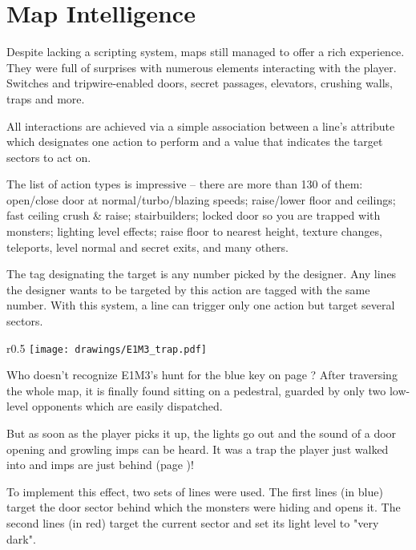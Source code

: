 \section{Map Intelligence}
Despite lacking a scripting system, maps still managed to offer a rich experience. They were full of surprises with numerous elements interacting with the player. Switches and tripwire-enabled doors, secret passages, elevators, crushing walls, traps and more.\\
\par
{}
\par
All interactions are achieved via a simple association between a line's  attribute which designates one action to perform and a  value that indicates the target sectors to act on.\\
\par
The list of action types is impressive -- there are more than 130 of them: open/close door at normal/turbo/blazing speeds; raise/lower floor and ceilings; fast ceiling crush \& raise; stairbuilders; locked door so you are trapped with monsters; lighting level effects; raise floor to nearest height, texture changes, teleports, level normal and secret exits, and many others.\\
\par
The tag designating the target is any number picked by the designer. Any lines the designer wants to be targeted by this action are tagged with the same number. With this system, a line can trigger only one action but target several sectors.\\
\par
{}
\pagebreak






\begin{wrapfigure}[17]{r}{0.5\textwidth}
\centering
\texttt{[image: drawings/E1M3\_trap.pdf]}
\end{wrapfigure}
Who doesn't recognize E1M3's hunt for the blue key on page \pageref{e1m3_trap}? After traversing the whole map, it is finally found sitting on a pedestral, guarded by only two low-level opponents which are easily dispatched.\\
\par
But as soon as the player picks it up, the lights go out and the sound of a door opening and growling imps can be heard. It was a trap the player just walked into and imps are just behind (page \pageref{e1m3_trap})!\\
\par
To implement this effect, two sets of lines were used. The first lines (in blue) target the door sector behind which the monsters were hiding and opens it. The second lines (in red) target the current sector and set its light level to "very dark".\\
\par




